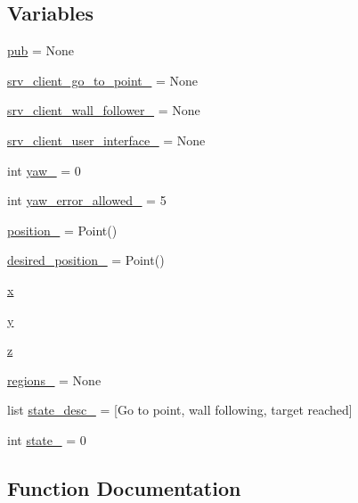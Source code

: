 \subsection*{Variables}
\begin{DoxyCompactItemize}
\item 
\hyperlink{namespacebug__m_adc14150838edf40c8028207cd6bb2082}{pub} = None
\item 
\hyperlink{namespacebug__m_abd32bbd25b55f71e56505e72ba56c2f6}{srv\+\_\+client\+\_\+go\+\_\+to\+\_\+point\+\_\+} = None
\item 
\hyperlink{namespacebug__m_af40e8063430e5b54ef2f3f8368338744}{srv\+\_\+client\+\_\+wall\+\_\+follower\+\_\+} = None
\item 
\hyperlink{namespacebug__m_ac6217733c79e361a3bf86e4f51b6ecfd}{srv\+\_\+client\+\_\+user\+\_\+interface\+\_\+} = None
\item 
int \hyperlink{namespacebug__m_a8b5b5c9259592b8efd526c5adb95d95b}{yaw\+\_\+} = 0
\item 
int \hyperlink{namespacebug__m_a23e5e76f14d9d0d139767cb229a53dda}{yaw\+\_\+error\+\_\+allowed\+\_\+} = 5
\item 
\hyperlink{namespacebug__m_ab108d02234aa3ec58605b9f6980ec090}{position\+\_\+} = Point()
\item 
\hyperlink{namespacebug__m_a8fb60e35f164091fe3355d3a0bce95af}{desired\+\_\+position\+\_\+} = Point()
\item 
\hyperlink{namespacebug__m_af10f89c7f929c9babce108f5d7382996}{x}
\item 
\hyperlink{namespacebug__m_ab8596d2ae799585b0d89152b55891aa8}{y}
\item 
\hyperlink{namespacebug__m_afbb54887da57b97920c8d36c6daed1fc}{z}
\item 
\hyperlink{namespacebug__m_ac9d4d95c034fca5a2b5d08ea845bbfcb}{regions\+\_\+} = None
\item 
list \hyperlink{namespacebug__m_ae70f71d3816862f72790fae7bfaa543b}{state\+\_\+desc\+\_\+} = \mbox{[}\textquotesingle{}Go to point\textquotesingle{}, \textquotesingle{}wall following\textquotesingle{}, \textquotesingle{}target reached\textquotesingle{}\mbox{]}
\item 
int \hyperlink{namespacebug__m_a79dc362dff5bef439beacdd5c0c3b2f1}{state\+\_\+} = 0
\end{DoxyCompactItemize}


\subsection{Function Documentation}
